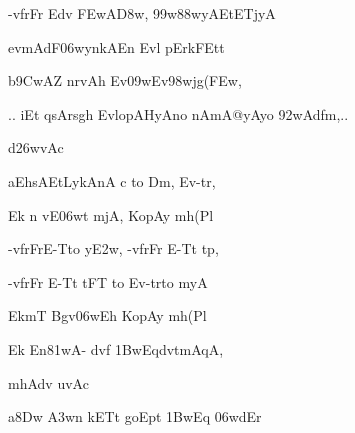 {\dn -vfrFr\2 Edv\2 \3FEwA\3D8w, \399w\388wyAEtETjyA \vegdn\dontdisplaylinenum}

{\dn evmAdF\306wyn\?kAEn Evl\? pErkFEt\0t \dontdisplaylinenum}

{\dn b\5\39CwAZ\2 nr\?vAh Ev\309wEv\0\398wjg(\3FEw, \vegdn\dontdisplaylinenum}

{\dn 
\jump
\begin{center}
{..} iEt qsArs\2g\5h\? EvlopAHyAno nAmA@yAyo \392wAdfm,{..}
\end{center}\vers}

\dnvers
\bekveg\szamveg\vfill\phpspagebreak\szam\bek{}
\thispagestyle{empty}



\jump\jump 
{\dn d\?\326wvAc{\dandabdn}\dontdisplaylinenum }

{\dn aEh\2sAEtLykAnA\2 c to Dm\0, Ev-tr,{\dandadn} \dontdisplaylinenum}

{\dn Ek\2 n v\0E\306wt mjA, KopAy\2 mh(Pl \vegdn\dontdisplaylinenum}

{\dn -vfrFrE-Tto y\3E2w, -vfrFr\? E-Tt\2 tp,{\dandabdn} \dontdisplaylinenum}

{\dn -vfrFr\? E-Tt\2 tFT{\rdt} to Ev-trto myA \vegdn\dontdisplaylinenum}

{\dn EkmT{\rdt} Bgv\306w\5Eh KopAy\2 mh(Pl \dontdisplaylinenum}

{\dn Ek\2 En\381wA- d\?v\?f \31BwEqd\4vtmAqA, \vegdn\dontdisplaylinenum}

{\dn mhAd\?v uvAc{\dandabdn}\dontdisplaylinenum }

{\dn a\38Dw \3A3w\?n kETt\2 goEpt\2 \31BwEq \306wdEr{\dandadn} \dontdisplaylinenum}


